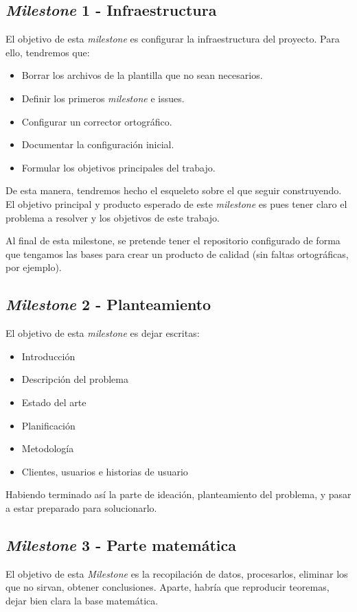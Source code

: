 \subsection{\textit{Milestone} 1 - Infraestructura}
El objetivo de esta \textit{milestone} es configurar la infraestructura del proyecto. Para ello, tendremos que:
\begin{itemize}
    \item Borrar los archivos de la plantilla que no sean necesarios.
    \item Definir los primeros \textit{milestone} e issues.
    \item Configurar un corrector ortográfico.
    \item Documentar la configuración inicial.
    \item Formular los objetivos principales del trabajo.
\end{itemize} 
De esta manera, tendremos hecho el esqueleto sobre el que seguir construyendo. El objetivo principal y 
producto esperado de este \textit{milestone} es pues tener claro el problema a resolver y los objetivos 
de este trabajo.
   
Al final de esta milestone, se pretende tener el repositorio configurado de forma que tengamos las 
bases para crear un producto de calidad (sin faltas ortográficas, por ejemplo).

\subsection{\textit{Milestone} 2 - Planteamiento}
El objetivo de esta \textit{milestone} es dejar escritas:

\begin{itemize}
    \item Introducción
    \item Descripción del problema
    \item Estado del arte
    \item Planificación
    \item Metodología
    \item Clientes, usuarios e historias de usuario
\end{itemize}

Habiendo terminado así la parte de ideación, planteamiento del problema, y pasar a estar preparado para solucionarlo.

\subsection{\textit{Milestone} 3 - Parte matemática} 
El objetivo de esta \textit{Milestone} es la recopilación de datos, procesarlos, eliminar los que 
no sirvan, obtener conclusiones. Aparte, habría que reproducir teoremas, dejar bien clara la base matemática.

